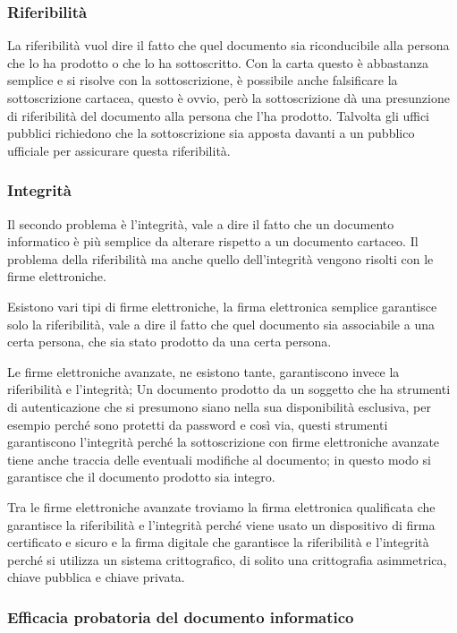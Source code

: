 \subsubsection{Riferibilità}
La riferibilità vuol dire il fatto che quel documento sia riconducibile alla persona che lo ha prodotto o che lo ha sottoscritto. Con la carta questo è abbastanza semplice e si risolve con la sottoscrizione, è possibile anche falsificare la sottoscrizione cartacea, questo è ovvio, però la sottoscrizione dà una presunzione di riferibilità del documento alla persona che l'ha prodotto. Talvolta gli uffici pubblici richiedono che la sottoscrizione sia apposta davanti a un pubblico ufficiale per assicurare questa riferibilità. 

\subsubsection{Integrità}
Il secondo problema è l'integrità, vale a dire il fatto che un documento informatico è più semplice da alterare rispetto a un documento cartaceo. Il problema della riferibilità ma anche quello dell'integrità vengono risolti con le firme elettroniche. 

Esistono vari tipi di firme elettroniche, la firma elettronica semplice garantisce solo la riferibilità, vale a dire il fatto che quel documento sia associabile a una certa persona, che sia stato prodotto da una certa persona. 

Le firme elettroniche avanzate, ne esistono tante, garantiscono invece la riferibilità e l'integrità; 
Un documento prodotto da un soggetto che ha strumenti di autenticazione che si presumono siano nella sua disponibilità esclusiva, per esempio perché sono protetti da password e così via, questi strumenti  garantiscono l'integrità perché la sottoscrizione con firme elettroniche avanzate tiene anche traccia delle eventuali modifiche al documento; in questo modo si garantisce che il documento prodotto sia integro. 

Tra le firme elettroniche avanzate troviamo la firma elettronica qualificata che garantisce la riferibilità e l'integrità perché viene usato un dispositivo di firma certificato e sicuro e la firma digitale che garantisce la riferibilità e l'integrità perché si utilizza un sistema crittografico, di solito una crittografia asimmetrica, chiave pubblica e chiave privata. 

\subsubsection{Efficacia probatoria del documento informatico}

